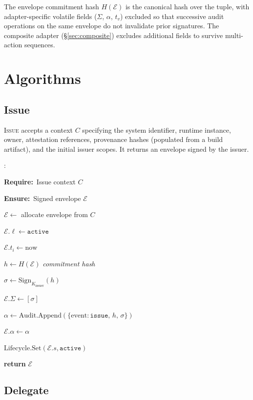 \documentclass[11pt,a4paper]{article}
\newcommand{\AlgKwd}[1]{\textbf{#1}}
\newcommand{\Require}{\AlgKwd{Require:}~}
\newcommand{\Ensure}{\AlgKwd{Ensure:}~}
\newcommand{\Comment}[1]{\hfill\textit{\small#1}}
\newenvironment{algorithmic}
  {\begin{framed}\small\begin{list}{\arabic{enumi}:}{%
      \usecounter{enumi}\setlength{\itemsep}{0pt}\setlength{\parsep}{0pt}%
      \setlength{\leftmargin}{2.2em}\setlength{\labelwidth}{1.8em}}}
  {\end{list}\end{framed}}
\begin{document}
The envelope commitment hash $H(\mathcal{E})$ is the canonical hash over
the tuple, with adapter-specific volatile fields ($\Sigma$, $\alpha$,
$t_v$) excluded so that successive audit operations on the same envelope
do not invalidate prior signatures. The composite adapter
(\S\ref{sec:composite}) excludes additional fields to survive
multi-action sequences.

\section{Algorithms}\label{sec:algorithms}

\subsection{Issue}

\textsc{Issue} accepts a context $C$ specifying the system identifier,
runtime instance, owner, attestation references, provenance hashes
(populated from a build artifact), and the initial issuer scopes. It
returns an envelope signed by the issuer.

\begin{algo}
\caption{\textsc{Issue}($C$)}\label{alg:issue}
\begin{algorithmic}
\item \Require Issue context $C$
\item \Ensure Signed envelope $\mathcal{E}$
\item $\mathcal{E} \gets$ allocate envelope from $C$
\item $\mathcal{E}.\ell \gets \texttt{active}$
\item $\mathcal{E}.t_i \gets \mathrm{now}$
\item $h \gets H(\mathcal{E})$ \Comment{commitment hash}
\item $\sigma \gets \mathrm{Sign}_{K_\text{issuer}}(h)$
\item $\mathcal{E}.\Sigma \gets [\sigma]$
\item $\alpha \gets \mathrm{Audit.Append}(\{\text{event}: \texttt{issue},\, h,\, \sigma\})$
\item $\mathcal{E}.\alpha \gets \alpha$
\item $\mathrm{Lifecycle.Set}(\mathcal{E}.s, \texttt{active})$
\item \textbf{return} $\mathcal{E}$
\end{algorithmic}
\end{algo}

\subsection{Delegate}
\end{document}
